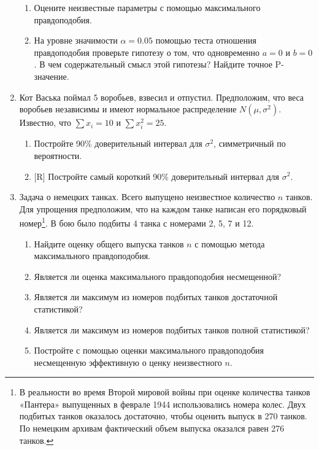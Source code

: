 \begin{enumerate}
\begin{enumerate}
\item Оцените неизвестные параметры с помощью максимального правдоподобия.
\item На уровне значимости $\alpha=0.05$ помощью теста отношения правдоподобия
проверьте гипотезу о том, что одновременно $a=0$ и $b=0$. В чем содержательный
смысл этой гипотезы? Найдите точное P-значение.
\end{enumerate}


\item Кот Васька поймал 5 воробьев, взвесил и отпустил. Предположим, что веса
воробьев независимы и имеют нормальное распределение $N(\mu,\sigma^2)$. Известно,
что $\sum x_i=10$ и $\sum x_i^2=25$.
\begin{enumerate}
\item Постройте 90\% доверительный интервал для $\sigma^2$, симметричный по вероятности.
\item $[$R]  Постройте самый короткий 90\% доверительный интервал для $\sigma^2$.
\end{enumerate}

\item Задача о немецких танках. Всего выпущено неизвестное количество $n$ танков.
Для упрощения предположим, что на каждом танке написан его порядковый номер\footnote{В
реальности во время Второй мировой войны при оценке количества танков «Пантера»
выпущенных в феврале 1944 использовались номера колес. Двух подбитых танков оказалось
достаточно, чтобы оценить выпуск в 270 танков. По немецким архивам фактический объем
выпуска оказался равен 276 танков. }. В бою было подбиты 4 танка с номерами 2, 5, 7 и 12.
\begin{enumerate}
\item Найдите оценку общего выпуска танков $n$ с помощью метода максимального правдоподобия.
\item Является ли оценка максимального правдоподобия несмещенной?
\item Является ли максимум из номеров подбитых танков достаточной статистикой?
\item Является ли максимум из номеров подбитых танков полной статистикой?
\item Постройте с помощью оценки максимального правдоподобия несмещенную эффективную о
ценку неизвестного $n$.
\end{enumerate}


\end{enumerate}
